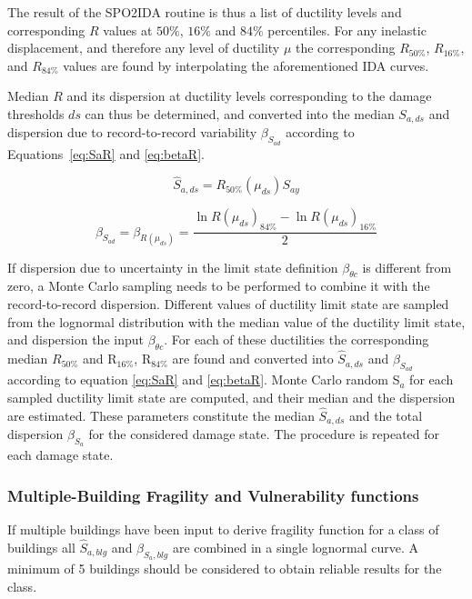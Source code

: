 The result of the SPO2IDA routine is thus a list of ductility levels and corresponding $R$ values at $50\%$, $16\%$ and $84\%$ percentiles. For any inelastic displacement, and therefore any level of ductility $\mu$ the corresponding $R_{50\%}$, $R_{16\%}$, and $R_{84\%}$ values are found by interpolating the aforementioned IDA curves.

Median $R$ and its dispersion at ductility levels corresponding to the damage thresholds $ds$ can thus be determined, and converted into the median $S_{a, ds}$ and dispersion due to record-to-record variability $\beta_{S_{a d}}$ according to Equations~\ref{eq:SaR} and \ref{eq:betaR}.

\begin{equation}
	\hat{S}_{a, ds} = R_{50\%}(\mu_{ds}) S_{ay}
	\label{eq:SaR}
\end{equation}

\begin{equation}
	\beta_{S_{a d}} = \beta_{R(\mu_{ds})} = \frac{\ln R(\mu_{ds})_{84\%} - \ln R(\mu_{ds})_{16\%}}{2}
	\label{eq:betaR}
\end{equation}

If dispersion due to uncertainty in the limit state definition $\beta_{\theta c}$ is different from zero, a Monte Carlo sampling needs to be performed to combine it with the record-to-record dispersion. Different values of ductility limit state are sampled from the lognormal distribution with the median value of the ductility limit state, and dispersion the input $\beta_{\theta c}$. For each of these ductilities the corresponding median $R_{50\%}$ and R$_{16\%}$, R$_{84\%}$ are found and converted into $\hat{S}_{a,ds}$ and $\beta_{S_{a d}}$ according to equation \ref{eq:SaR} and \ref{eq:betaR}. Monte Carlo random S$_a$ for each sampled ductility limit state are computed, and their median and the dispersion are estimated. These parameters constitute the median $\hat{S}_{a,ds}$ and the total dispersion $\beta_{S_a}$ for the considered damage state. The procedure is repeated for each damage state.

\subsubsection{Multiple-Building Fragility and Vulnerability functions}
\label{subsubsec:multiple-buildings}
If multiple buildings have been input to derive fragility function for a class of buildings all $\hat{S}_{a, blg}$ and $\beta_{S_a, blg}$ are combined in a single lognormal curve. A minimum of 5 buildings should be considered to obtain reliable results for the class.\\

